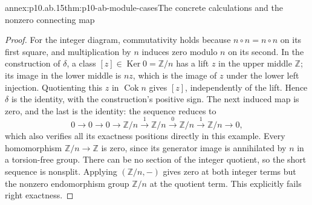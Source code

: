 \begin{annexitem}{annex:p10.ab.15}{thm:p10-ab-module-cases}{The concrete calculations and the nonzero connecting map}
\begin{proof}
For the integer diagram, commutativity holds because
\(n\circ n=n\circ n\) on its first square, and multiplication by
\(n\) induces zero modulo \(n\) on its second. In the construction
of \(\delta\), a class \([z]\in\operatorname{Ker}0=\mathbb Z/n\)
has a lift \(z\) in the upper middle \(\mathbb Z\); its image in
the lower middle is \(nz\), which is the image of \(z\) under the
lower left injection. Quotienting this \(z\) in
\(\operatorname{Cok}n\) gives \([z]\), independently of the lift.
Hence \(\delta\) is the identity, with the construction's positive
sign. The next induced map is zero, and the last is the identity:
the sequence reduces to
\[
 0\to0\to0\to\mathbb Z/n\xrightarrow{1}\mathbb Z/n
 \xrightarrow{0}\mathbb Z/n\xrightarrow{1}\mathbb Z/n\to0,
\]
which also verifies all its exactness positions directly in this example.
Every homomorphism \(\mathbb Z/n\to\mathbb Z\) is zero, since its
generator image is annihilated by \(n\) in a torsion-free group. There
can be no section of the integer quotient, so the short sequence is
nonsplit. Applying \((\mathbb Z/n,-)\) gives zero at both integer
terms but the nonzero endomorphism group \(\mathbb Z/n\) at the
quotient term. This explicitly fails right exactness.
\end{proof}
\end{annexitem}

